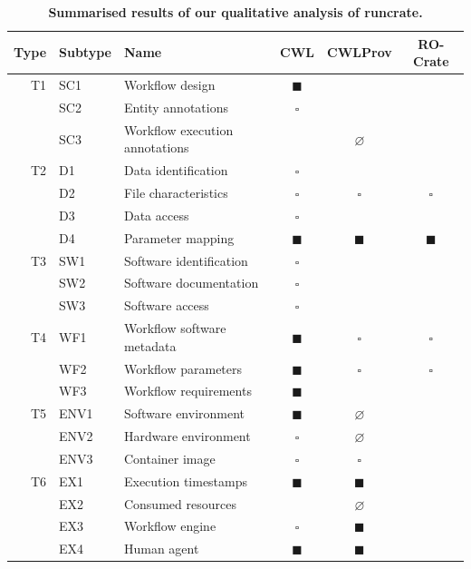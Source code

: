 \begin{table}[!ht]
\centering
\caption{
{\bf Summarised results of our qualitative analysis of runcrate.}}
\begin{tabular}{r|l|l|c|c|c}
\hline
{\bf Type} & {\bf Subtype} & {\bf Name} & {\bf CWL} & {\bf CWLProv} & {\bf RO-Crate} \\ \hline
T1 & SC1 & Workflow design & $\blacksquare$ & &\\ 
& SC2 & Entity annotations & $\square$ & &\\ 
& SC3 & Workflow execution annotations  & & $\varnothing$ &  \\ \hline
T2 & D1 & Data identification & $\square$ & & \\
& D2 & File characteristics & $\square$ & $\square$ & $\square$ \\
& D3 & Data access & $\square$ & & \\ 
& D4 & Parameter mapping & $\blacksquare$ & $\blacksquare$ & $\blacksquare$ \\ \hline 
T3 & SW1 & Software identification & $\square$ & & \\ 
& SW2 & Software documentation & $\square$ & & \\  
& SW3 & Software access & $\square$ & & \\ \hline 
T4 & WF1 & Workflow software metadata & $\blacksquare$ & $\square$ & $\square$ \\ 
& WF2 & Workflow parameters & $\blacksquare$ & $\square$ & $\square$ \\ 
& WF3 & Workflow requirements & $\blacksquare$ & & \\ \hline 
T5 & ENV1 & Software environment & $\blacksquare$ & $\varnothing$ & \\ 
& ENV2 & Hardware environment & $\square$ & $\varnothing$ &\\ 
& ENV3 & Container image & $\square$ & $\square$ & \\ \hline 
T6 & EX1 & Execution timestamps & $\blacksquare$ & $\blacksquare$ &\\ 
& EX2 & Consumed resources & &  $\varnothing$  & \\ 
& EX3 & Workflow engine & $\square$ & $\blacksquare$ & \\  
& EX4 & Human agent & $\blacksquare$ & $\blacksquare$ & \\ \hline

\end{tabular}
\end{table}
